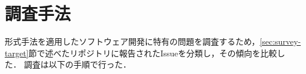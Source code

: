 \documentclass[main]{subfiles}
\begin{document}
\chapter{調査手法}


形式手法を適用したソフトウェア開発に特有の問題を調査するため，\ref{sec:survey-target}節で述べたリポジトリに報告されたIssueを分類し，その傾向を比較した．
調査は以下の手順で行った．
\end{document}

